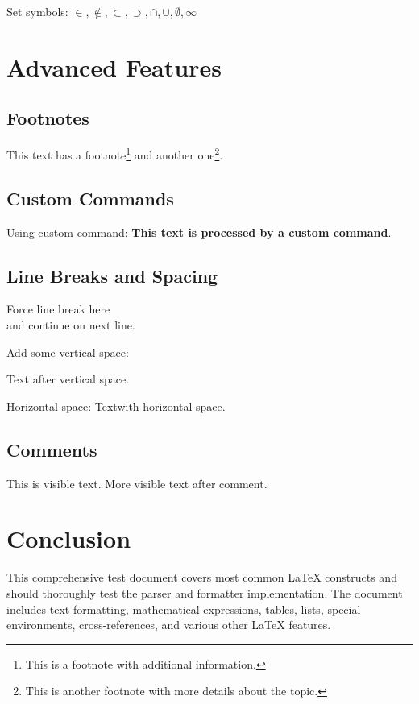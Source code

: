 \documentclass[12pt,a4paper,twoside]{article}
\newcommand{\mycommand}[1]{\textbf{#1}}
\begin{document}
Set symbols: $\in, \notin, \subset, \supset, \cap, \cup, \emptyset, \infty$

\section{Advanced Features}

\subsection{Footnotes}

This text has a footnote\footnote{This is a footnote with additional information.} and another one\footnote{This is another footnote with more details about the topic.}.

\subsection{Custom Commands}

Using custom command: \mycommand{This text is processed by a custom command}.

\subsection{Line Breaks and Spacing}

Force line break here \\
and continue on next line.

Add some vertical space:

\vspace{1cm}

Text after vertical space.

Horizontal space: Text\hspace{2cm}with horizontal space.

\subsection{Comments}

This is visible text.
More visible text after comment.

\section{Conclusion}

This comprehensive test document covers most common LaTeX constructs and should thoroughly test the parser and formatter implementation. The document includes text formatting, mathematical expressions, tables, lists, special environments, cross-references, and various other LaTeX features.
\end{document}
